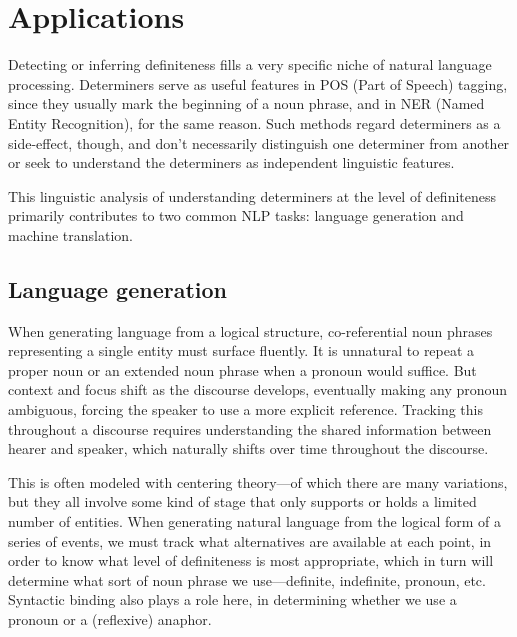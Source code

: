 \documentclass[11pt]{article}
\begin{document}
\section{Applications}
Detecting or inferring definiteness fills a very specific niche of natural language processing. Determiners serve as useful features in POS (Part of Speech) tagging, since they usually mark the beginning of a noun phrase, and in NER (Named Entity Recognition), for the same reason. Such methods regard determiners as a side-effect, though, and don't necessarily distinguish one determiner from another or seek to understand the determiners as independent linguistic features.

This linguistic analysis of understanding determiners at the level of definiteness primarily contributes to two common NLP tasks: language generation and machine translation.



\subsection{Language generation}
When generating language from a logical structure, co-referential noun phrases representing a single entity must surface fluently. It is unnatural to repeat a proper noun or an extended noun phrase when a pronoun would suffice. But context and focus shift as the discourse develops, eventually making any pronoun ambiguous, forcing the speaker to use a more explicit reference. Tracking this throughout a discourse requires understanding the shared information between hearer and speaker, which naturally shifts over time throughout the discourse.

This is often modeled with centering theory---of which there are many variations, but they all involve some kind of stage that only supports or holds a limited number of entities. When generating natural language from the logical form of a series of events, we must track what alternatives are available at each point, in order to know what level of definiteness is most appropriate, which in turn will determine what sort of noun phrase we use---definite, indefinite, pronoun, etc. Syntactic binding also plays a role here, in determining whether we use a pronoun or a (reflexive) anaphor.
\end{document}
